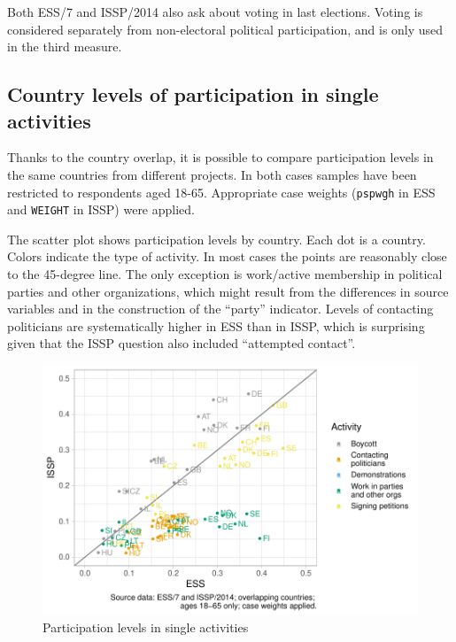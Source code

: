 \documentclass[12pt,]{article}
\begin{document}
Both ESS/7 and ISSP/2014 also ask about voting in last elections. Voting is considered separately from non-electoral political participation, and is only used in the third measure.

\hypertarget{country-levels-of-participation-in-single-activities}{%
\subsection{Country levels of participation in single activities}\label{country-levels-of-participation-in-single-activities}}

Thanks to the country overlap, it is possible to compare participation levels in the same countries from different projects. In both cases samples have been restricted to respondents aged 18-65. Appropriate case weights (\texttt{pspwgh} in ESS and \texttt{WEIGHT} in ISSP) were applied.

The scatter plot shows participation levels by country. Each dot is a country. Colors indicate the type of activity. In most cases the points are reasonably close to the 45-degree line. The only exception is work/active membership in political parties and other organizations, which might result from the differences in source variables and in the construction of the ``party'' indicator. Levels of contacting politicians are systematically higher in ESS than in ISSP, which is surprising given that the ISSP question also included ``attempted contact''.

\begin{figure}[H]

{\centering \includegraphics{report_files/figure-latex/part-rate-dot-plot-1} 

}

\caption{Participation levels in single activities}\label{fig:part-rate-dot-plot}
\end{figure}
\end{document}
